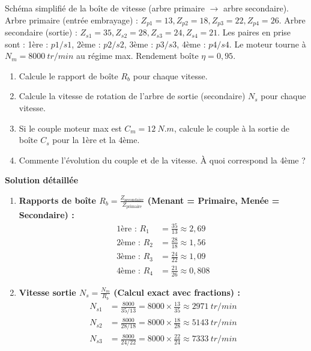 \documentclass[11pt]{article}
\begin{document}
\begin{exoresolu}
    Schéma simplifié de la boîte de vitesse (arbre primaire $\rightarrow$ arbre secondaire). Arbre primaire (entrée embrayage) : $Z_{p1}=13, Z_{p2}=18, Z_{p3}=22, Z_{p4}=26$. Arbre secondaire (sortie) : $Z_{s1}=35, Z_{s2}=28, Z_{s3}=24, Z_{s4}=21$. Les paires en prise sont : 1ère : $p1/s1$, 2ème : $p2/s2$, 3ème : $p3/s3$, 4ème : $p4/s4$. Le moteur tourne à $N_m = \SI{8000}{tr/min}$ au régime max. Rendement boîte $\eta = 0,95$.
    \begin{enumerate}
        \item Calcule le rapport de boîte $R_b$ pour chaque vitesse.
        \item Calcule la vitesse de rotation de l'arbre de sortie (secondaire) $N_s$ pour chaque vitesse.
        \item Si le couple moteur max est $C_m = \SI{12}{N.m}$, calcule le couple à la sortie de boîte $C_s$ pour la 1ère et la 4ème.
        \item Commente l'évolution du couple et de la vitesse. À quoi correspond la 4ème ?
    \end{enumerate}
    \tcblower
    \textbf{Solution détaillée}
    \begin{enumerate}
        \item \textbf{Rapports de boîte $R_b = \frac{Z_{\text{secondaire}}}{Z_{\text{primaire}}}$ (Menant = Primaire, Menée = Secondaire) :}
              \begin{align*}
                  \text{1ère : } R_1 &= \frac{35}{13} \approx 2,69 \\
                  \text{2ème : } R_2 &= \frac{28}{18} \approx 1,56 \\
                  \text{3ème : } R_3 &= \frac{24}{22} \approx 1,09 \\
                  \text{4ème : } R_4 &= \frac{21}{26} \approx 0,808
              \end{align*}
        \item \textbf{Vitesse sortie $N_s = \frac{N_m}{R_b}$ (Calcul exact avec fractions) :}
              \begin{align*}
                  N_{s1} &= \frac{8000}{35/13} = 8000 \times \frac{13}{35} \approx \SI{2971}{tr/min} \\
                  N_{s2} &= \frac{8000}{28/18} = 8000 \times \frac{18}{28} \approx \SI{5143}{tr/min} \\
                  N_{s3} &= \frac{8000}{24/22} = 8000 \times \frac{22}{24} \approx \SI{7333}{tr/min} \\

\end{align*}
\end{enumerate}
\end{exoresolu}
\end{document}
